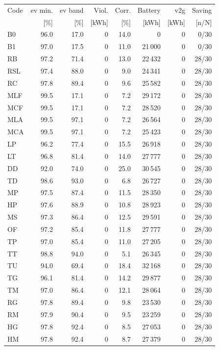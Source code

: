 \noindent\begin{minipage}{\textwidth}\singlespacing\captionsetup{font=footnotesize}
\setlength{\tabcolsep}{4pt}
\renewcommand{\arraystretch}{1.0}
\label{tab:full-scorecard-2-1}
\fontsize{8}{9}\selectfont
\begin{tabular*}{\textwidth}{@{\extracolsep{\fill}}lrrrrrrr@{}}
\toprule
Code & \gls{ev} min. & \gls{ev} band & Viol. & Corr. & Battery & \gls{v2g} & Saving\\
 & [\%] & [\%] & [kWh] & [\%] & [kWh] & [kWh] & [n/N]\\
\midrule
B0 & 96.0 & 17.0 & 0 & 14.0 & 0 & 0 & 0/30\\
B1 & 97.0 & 17.5 & 0 & 11.0 & 21\,000 & 0 & 0/30\\
RB & 97.2 & 71.4 & 0 & 13.0 & 22\,432 & 0 & 28/30\\
RSL & 97.4 & 88.0 & 0 & 9.0 & 24\,341 & 0 & 28/30\\
RC & 97.8 & 89.4 & 0 & 9.6 & 25\,582 & 0 & 28/30\\
MLF & 99.5 & 17.1 & 0 & 7.2 & 29\,172 & 0 & 28/30\\
MCF & 99.5 & 17.1 & 0 & 7.2 & 28\,520 & 0 & 28/30\\
MLA & 99.5 & 97.1 & 0 & 7.2 & 26\,564 & 0 & 28/30\\
MCA & 99.5 & 97.1 & 0 & 7.2 & 25\,423 & 0 & 28/30\\
LP & 96.2 & 77.4 & 0 & 15.5 & 26\,918 & 0 & 28/30\\
LT & 96.8 & 81.4 & 0 & 14.0 & 27\,777 & 0 & 28/30\\
DD & 92.0 & 74.0 & 0 & 25.0 & 30\,545 & 0 & 28/30\\
TD & 98.6 & 93.0 & 0 & 6.8 & 26\,727 & 0 & 28/30\\
MP & 97.5 & 87.4 & 0 & 11.5 & 28\,350 & 0 & 28/30\\
HP & 97.6 & 88.9 & 0 & 10.8 & 28\,923 & 0 & 28/30\\
MS & 97.3 & 86.4 & 0 & 12.5 & 29\,591 & 0 & 28/30\\
OF & 97.2 & 85.4 & 0 & 11.8 & 27\,777 & 0 & 28/30\\
TP & 97.0 & 85.4 & 0 & 11.0 & 27\,205 & 0 & 28/30\\
TT & 98.8 & 94.0 & 0 & 5.1 & 26\,345 & 0 & 28/30\\
TU & 94.0 & 69.4 & 0 & 18.4 & 32\,168 & 0 & 28/30\\
TG & 96.1 & 81.4 & 0 & 14.2 & 29\,877 & 0 & 28/30\\
TM & 97.0 & 86.4 & 0 & 12.1 & 28\,064 & 0 & 28/30\\
RG & 97.8 & 89.4 & 0 & 9.8 & 23\,530 & 0 & 28/30\\
RM & 97.9 & 90.4 & 0 & 9.5 & 23\,259 & 0 & 28/30\\
HG & 97.8 & 92.4 & 0 & 8.5 & 27\,053 & 0 & 28/30\\
HM & 97.8 & 92.4 & 0 & 8.7 & 27\,379 & 0 & 28/30\\
\bottomrule\end{tabular*}
\end{minipage}\par\medskip
